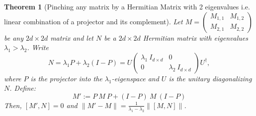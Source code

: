 \documentclass[11pt]{article}
\theoremstyle{plain}
\newtheorem{theorem}{Theorem}[section]
\begin{document}
\begin{theorem}[Pinching any matrix by a Hermitian Matrix with 2 eigenvalues i.e. linear combination of a projector and its complement]\label{thm:pinch}
    Let $M = \begin{pmatrix}
        M_{1,1} & M_{1,2}\\
        M_{2,1} & M_{2,2}
    \end{pmatrix}$ be any $2d \times 2d$ matrix and let $N$ be a $2d \times 2d$ Hermitian matrix with eigenvalues $\lambda_1 > \lambda_2$. Write
    \[ N= \lambda_1 P + \lambda_2 (I - P) = U \begin{pmatrix}
        \lambda_1\: I_{d \times d} & 0\\ 0 & \lambda_2\: I_{d \times d}
    \end{pmatrix} U^\dagger , \] where $P$ is the projector into the $\lambda_1$-eigenspace and $U$ is the unitary diagonalizing $N$. Define:
    \begin{equation}
        M' := P\ M\ P + (I - P)\ M\ (I - P)
    \end{equation}
    Then, $[M', N] = 0$ and $\|M' - M \| = \frac{1}{\lambda_1 - \lambda_2} \|[M, N]\|$.
\end{theorem}
\end{document}
